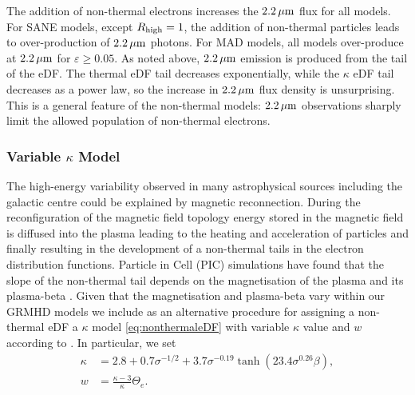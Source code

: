 
The addition of non-thermal electrons increases the $2.2\,\mu\mathrm{m}$ flux for all models.
For SANE models, except $R_\mathrm{high}=1$, the addition of non-thermal particles leads to over-production of $2.2\,\mu\mathrm{m}$ photons.
For MAD models, all models over-produce at $2.2\,\mu\mathrm{m}$ for $\varepsilon \ge 0.05$.
As noted above, $2.2\,\mu\mathrm{m}$ emission is produced from the tail of the eDF.
The thermal eDF tail decreases exponentially, while the $\kappa$ eDF tail decreases as a power law, so the increase in $2.2\,\mu\mathrm{m}$ flux density is unsurprising.
This is a general feature of the non-thermal models: $2.2\,\mu\mathrm{m}$ observations sharply limit the allowed population of non-thermal electrons.

\subsubsection{Variable \texorpdfstring{$\kappa$}{kappa} Model}

The high-energy variability observed in many astrophysical sources including the galactic centre could be explained by magnetic reconnection.
During the reconfiguration of the magnetic field topology energy stored in the magnetic field is diffused into the plasma leading to the heating and acceleration of particles and finally resulting in the development of a non-thermal tails in the electron distribution functions.
Particle in Cell (PIC) simulations have found that the slope of the non-thermal tail depends on the magnetisation of the plasma and its plasma-beta \citep[see, e.g.,][]{2018ApJ...862...80B}.
Given that the magnetisation and plasma-beta vary within our GRMHD models we include as an alternative procedure for assigning a non-thermal eDF a $\kappa$ model \eqref{eq:nonthermaleDF} with variable $\kappa$ value and $w$ according to \cite{2018ApJ...862...80B}.
In particular, we set
\begin{align}
  \kappa &= 2.8 +0.7\sigma^{-1/2} + 3.7\sigma^{-0.19}\tanh{(23.4\sigma^{0.26}\beta)}, \label{eq:kappa}\\
  w      &= \frac{ \kappa -3 }{\kappa} \Theta_e.
\end{align}

